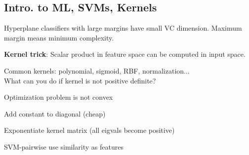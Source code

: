 \documentclass[12pt]{article}
\begin{document}
\subsection{Intro. to ML, SVMs, Kernels}
\par Hyperplane classifiers with large margins have small VC dimension. Maximum margin means minimum complexity.
\par \textbf{Kernel trick}: Scalar product in feature space can be computed in input space.
\par Common kernels: polynomial, sigmoid, RBF, normalization...
\\
What can you do if kernel is not positive definite?
\ulb
\item Optimization problem is not convex
\item Add constant to diagonal (cheap)
\item Exponentiate kernel matrix (all eigvals become positive)
\item SVM-pairwise use similarity as features
\ule
\end{document}

